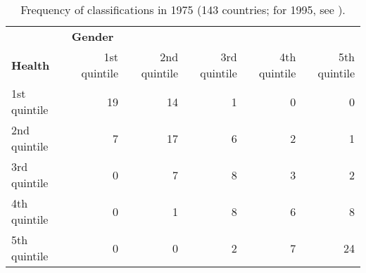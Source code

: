 \begin{table}[htb]
\centering
\caption{Frequency of classifications in 1975 (143 countries; for 1995, see ).}
\label{class1975n}
\begin{tabular}{lrrrrr}
\toprule
                & \multicolumn{5}{l}{\textbf{Gender}} \\
\textbf{Health} & 1st quintile & 2nd quintile & 3rd quintile & 4th quintile & 5th quintile \\
\midrule
1st quintile    & 19           & 14           & 1            & 0            & 0 \\
2nd quintile    & 7            & 17           & 6            & 2            & 1 \\
3rd quintile    & 0            & 7            & 8            & 3            & 2 \\
4th quintile    & 0            & 1            & 8            & 6            & 8 \\
5th quintile    & 0            & 0            & 2            & 7            & 24 \\
\bottomrule
\end{tabular}
\end{table}
